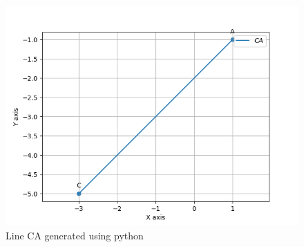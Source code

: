 \documentclass[12pt]{article}
\begin{document}
\begin{figure}
\centering
\includegraphics[width=\columnwidth]{solutions/1/1/5c/figs/fig.png}
\caption{Line CA generated using python}
\label{fig: line_CA_py}
\end{figure}
\end{document}
